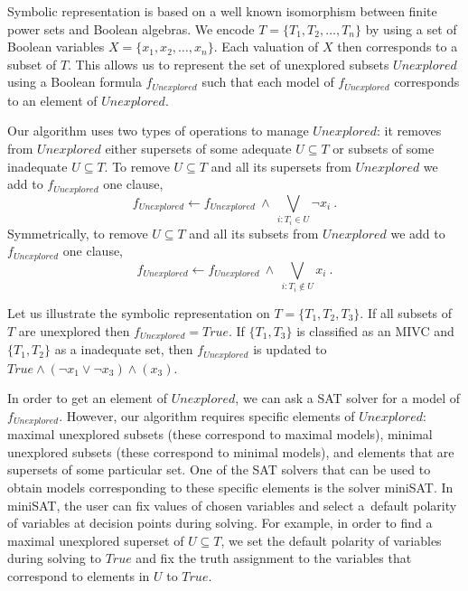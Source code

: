 Symbolic representation is based on a well known isomorphism between finite power sets and Boolean algebras. We encode $T = \{T_1, T_2, \ldots , T_n \}$ by using a set of Boolean variables $X = \{x_1, x_2, \ldots , x_n \}$. Each valuation of $X$ then corresponds to a subset of $T$. This allows us to represent the set of unexplored subsets $\mathit{Unexplored}$ using a Boolean formula $f_{\mathit{Unexplored}}$ such that each model of $f_{\mathit{Unexplored}}$ corresponds to an element of $\mathit{Unexplored}$.

Our algorithm uses two types of operations to manage $\mathit{Unexplored}$: it removes from $\mathit{Unexplored}$ either supersets of some adequate $U \subseteq T$ or subsets of some inadequate $U \subseteq T$. To remove $U \subseteq T$ and all its supersets from $\mathit{Unexplored}$ we add to $f_{\mathit{Unexplored}}$ one clause,
		$$f_{\mathit{Unexplored}} \gets f_{\mathit{Unexplored}} \ \wedge  \ \bigvee\limits_{i: T_i \in U} \neg x_i\ .$$
Symmetrically, to remove $U \subseteq T$ and all its subsets from $\mathit{Unexplored}$ we add to $f_{\mathit{Unexplored}}$  one clause,
		$$f_{\mathit{Unexplored}} \gets f_{\mathit{Unexplored}} \ \wedge \  \bigvee\limits_{i: T_i \not\in U} x_i\ .$$


\begin{example}\label{ex:unex}
Let us illustrate the symbolic representation on $T = \{ T_1, T_2, T_3 \}$. If  all subsets of $T$ are unexplored then $f_{\mathit{Unexplored}} = \mathit{True}$. If   $\{T_1, T_3 \}$ is classified as an MIVC and $\{T_1, T_2 \}$ as a inadequate set, then $f_{\mathit{Unexplored}}$ is updated to $\mathit{True} \wedge (\neg x_1 \vee \neg x_3) \wedge (x_3)$.
\end{example}


In order to get an element of $\mathit{Unexplored}$, we can ask a SAT solver for a model of $f_{\mathit{Unexplored}}$. However, our algorithm requires specific elements of $\mathit{Unexplored}$: maximal unexplored subsets (these correspond to maximal models), minimal unexplored subsets (these correspond to minimal models),
and elements that are supersets of some particular set.  One of the SAT solvers that can be used to obtain models corresponding to these specific elements is the solver miniSAT\cite{minisat}. In miniSAT,  the user can fix values of chosen variables and select a~default polarity of variables at decision points during solving.
For example, in order to find a maximal unexplored superset of $U \subseteq T$, we set the default polarity of variables during solving to $\mathit{True}$ and fix the truth assignment to the variables that correspond to elements in $U$ to $\mathit{True}$.

